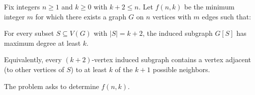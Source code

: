 Fix integers $n\ge 1$ and $k\ge 0$ with $k+2\le n$.
Let $f(n,k)$ be the minimum integer $m$ for which there exists a graph $G$ on $n$
vertices with $m$ edges such that:

\medskip
\noindent For every subset $S\subseteq V(G)$ with $|S|=k+2$, the induced subgraph
$G[S]$ has maximum degree at least $k$.

Equivalently, every $(k+2)$-vertex induced subgraph contains a vertex adjacent
(to other vertices of $S$) to at least $k$ of the $k+1$ possible neighbors.

The problem asks to determine $f(n,k)$.
